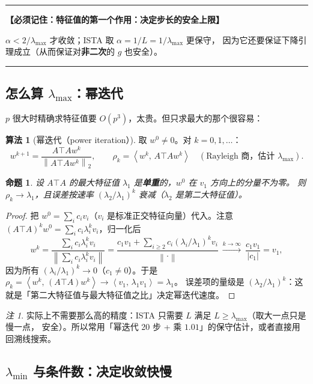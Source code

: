 \documentclass[11pt,a4paper,UTF8]{ctexart}
\theoremstyle{plain}
\newtheorem{proposition}[theorem]{命题}
\theoremstyle{definition}
\newtheorem{algorithmbox}[theorem]{算法}
\theoremstyle{remark}
\newtheorem{remark}[theorem]{注}
\newcommand{\norm}[1]{\left\lVert #1 \right\rVert}
\newcommand{\abs}[1]{\left\lvert #1 \right\rvert}
\newcommand{\inner}[2]{\left\langle #1,\, #2 \right\rangle}
\newenvironment{keypoint}[1]
  {\par\medskip\noindent\begin{minipage}{\linewidth}%
   \hrule\smallskip\noindent\textbf{【必须记住：#1】}\par\nopagebreak\smallskip}
  {\smallskip\hrule\end{minipage}\medskip}
\begin{document}
\begin{keypoint}{特征值的第一个作用：决定步长的安全上限}
$\alpha<2/\lambda_{\max}$ 才收敛；ISTA 取 $\alpha=1/L=1/\lambda_{\max}$ 更保守，
因为它还要保证下降引理成立（从而保证对\textbf{非二次}的 $g$ 也安全）。
\end{keypoint}

\subsection{怎么算 $\lambda_{\max}$：幂迭代}

$p$ 很大时精确求特征值要 $O(p^3)$，太贵。但只求最大的那个很容易：

\begin{algorithmbox}[幂迭代（power iteration）]
取 $w^0\neq0$。对 $k=0,1,\dots$：
\[
w^{k+1}=\frac{A\top Aw^k}{\norm{A\top Aw^k}_2},
\qquad
\rho_k=\inner{w^k}{A\top Aw^k}\quad(\text{Rayleigh 商，估计 }\lambda_{\max}).
\]
\end{algorithmbox}

\begin{proposition}\label{prop:power}
设 $A\top A$ 的最大特征值 $\lambda_1$ 是\textbf{单重}的，$w^0$ 在 $v_1$ 方向上的分量不为零。
则 $\rho_k\to\lambda_1$，且误差按速率 $(\lambda_2/\lambda_1)^k$ 衰减（$\lambda_2$ 是第二大特征值）。
\end{proposition}

\begin{proof}
把 $w^0=\sum_ic_iv_i$（$v_i$ 是标准正交特征向量）代入。注意
$(A\top A)^kw^0=\sum_ic_i\lambda_i^kv_i$，归一化后
\[
w^k=\frac{\sum_ic_i\lambda_i^kv_i}{\norm{\sum_ic_i\lambda_i^kv_i}}
=\frac{c_1v_1+\sum_{i\ge2}c_i(\lambda_i/\lambda_1)^kv_i}{\norm{\cdot}}\ \xrightarrow{k\to\infty}\ \frac{c_1v_1}{\abs{c_1}}=v_1 ,
\]
因为所有 $(\lambda_i/\lambda_1)^k\to0$（$c_1\neq0$）。于是
$\rho_k=\inner{w^k}{(A\top A)w^k}\to\inner{v_1}{\lambda_1v_1}=\lambda_1$。
误差项的量级是 $(\lambda_2/\lambda_1)^k$：这就是「第二大特征值与最大特征值之比」决定幂迭代速度。
\end{proof}

\begin{remark}
实际上不需要那么高的精度：ISTA 只需要 $L$ 满足 $L\ge\lambda_{\max}$（取大一点只是慢一点，
安全）。所以常用「幂迭代 20 步 + 乘 $1.01$」的保守估计，或者直接用回溯线搜索。
\end{remark}

\subsection{$\lambda_{\min}$ 与条件数：决定收敛快慢}
\end{document}
